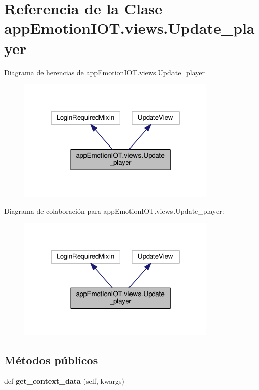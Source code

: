 \hypertarget{classappEmotionIOT_1_1views_1_1Update__player}{}\section{Referencia de la Clase app\+Emotion\+I\+O\+T.\+views.\+Update\+\_\+player}
\label{classappEmotionIOT_1_1views_1_1Update__player}


Diagrama de herencias de app\+Emotion\+I\+O\+T.\+views.\+Update\+\_\+player
\nopagebreak
\begin{figure}[H]
\begin{center}
\leavevmode
\includegraphics[width=270pt]{classappEmotionIOT_1_1views_1_1Update__player__inherit__graph}
\end{center}
\end{figure}


Diagrama de colaboración para app\+Emotion\+I\+O\+T.\+views.\+Update\+\_\+player\+:
\nopagebreak
\begin{figure}[H]
\begin{center}
\leavevmode
\includegraphics[width=270pt]{classappEmotionIOT_1_1views_1_1Update__player__coll__graph}
\end{center}
\end{figure}
\subsection*{Métodos públicos}
\begin{DoxyCompactItemize}
\item 
def {\bfseries get\+\_\+context\+\_\+data} (self, kwargs)\hypertarget{classappEmotionIOT_1_1views_1_1Update__player_a0e79ea7b8f113f9827dab1bc952347ae}{}\label{classappEmotionIOT_1_1views_1_1Update__player_a0e79ea7b8f113f9827dab1bc952347ae}

\end{DoxyCompactItemize}
